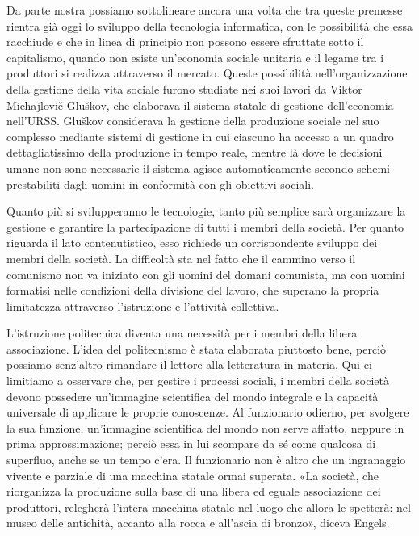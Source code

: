 \documentclass[12pt,a4paper,openany]{book}
\begin{document}
Da parte nostra possiamo sottolineare ancora una volta che tra queste premesse rientra già oggi lo sviluppo della tecnologia informatica, con le possibilità che essa racchiude e che in linea di principio non possono essere sfruttate sotto il capitalismo, quando non esiste un'economia sociale unitaria e il legame tra i produttori si realizza attraverso il mercato. Queste possibilità nell'organizzazione della gestione della vita sociale furono studiate nei suoi lavori da Viktor Michajlovič Gluškov, che elaborava il sistema statale di gestione dell'economia nell'URSS. Gluškov considerava la gestione della produzione sociale nel suo complesso mediante sistemi di gestione in cui ciascuno ha accesso a un quadro dettagliatissimo della produzione in tempo reale, mentre là dove le decisioni umane non sono necessarie il sistema agisce automaticamente secondo schemi prestabiliti dagli uomini in conformità con gli obiettivi sociali.

Quanto più si svilupperanno le tecnologie, tanto più semplice sarà organizzare la gestione e garantire la partecipazione di tutti i membri della società. Per quanto riguarda il lato contenutistico, esso richiede un corrispondente sviluppo dei membri della società. La difficoltà sta nel fatto che il cammino verso il comunismo non va iniziato con gli uomini del domani comunista, ma con uomini formatisi nelle condizioni della divisione del lavoro, che superano la propria limitatezza attraverso l'istruzione e l'attività collettiva.

L'istruzione politecnica diventa una necessità per i membri della libera associazione. L'idea del politecnismo è stata elaborata piuttosto bene, perciò possiamo senz'altro rimandare il lettore alla letteratura in materia. Qui ci limitiamo a osservare che, per gestire i processi sociali, i membri della società devono possedere un'immagine scientifica del mondo integrale e la capacità universale di applicare le proprie conoscenze. Al funzionario odierno, per svolgere la sua funzione, un'immagine scientifica del mondo non serve affatto, neppure in prima approssimazione; perciò essa in lui scompare da sé come qualcosa di superfluo, anche se un tempo c'era. Il funzionario non è altro che un ingranaggio vivente e parziale di una macchina statale ormai superata. «La società, che riorganizza la produzione sulla base di una libera ed eguale associazione dei produttori, relegherà l'intera macchina statale nel luogo che allora le spetterà: nel museo delle antichità, accanto alla rocca e all'ascia di bronzo», diceva Engels.
\end{document}
